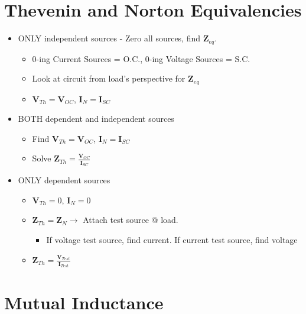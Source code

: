 \documentclass[10pt,letterpaper,final,twoside,notitlepage]{article}
\begin{document}
\section*{Thevenin and Norton Equivalencies} \label{sec:Thevenin/Norton}
	\begin{itemize}[noitemsep, nolistsep]
		\item ONLY independent sources - Zero all sources, find $\mathbf{Z}_{eq}$.
		\begin{itemize}[noitemsep, nolistsep] %
			\item 0-ing Current Sources = O.C., 0-ing Voltage Sources = S.C.
			\item Look at circuit from load's perspective for $\mathbf{Z}_{eq}$
			\item $\mathbf{V}_{Th}=\mathbf{V}_{OC}$, $\mathbf{I}_{N} = \mathbf{I}_{SC}$
		\end{itemize}
		\item BOTH dependent and independent sources
			\begin{itemize}[noitemsep, nolistsep] %
				\item Find $\mathbf{V}_{Th}=\mathbf{V}_{OC}$, $\mathbf{I}_{N}=\mathbf{I}_{SC}$
				\item Solve $\mathbf{Z}_{Th}=\frac{\mathbf{V}_{OC}}{\mathbf{I}_{SC}}$
			\end{itemize}
		\item ONLY dependent sources
			\begin{itemize}[noitemsep, nolistsep] %
				\item $\mathbf{V}_{Th}=0$, $\mathbf{I}_{N}=0$
				\item $\mathbf{Z}_{Th}=\mathbf{Z}_{N} \rightarrow$ Attach test source @ load.
				\begin{itemize}
					\item If voltage test source, find current. If current test source, find voltage
				\end{itemize}
				\item $\mathbf{Z}_{Th}=\frac{\mathbf{V}_{Test}}{\mathbf{I}_{Test}}$
			\end{itemize}
		\end{itemize}
	\vspace{-5mm}
	


\section*{Mutual Inductance} \label{sec:Mutual Inductance}
\end{document}
